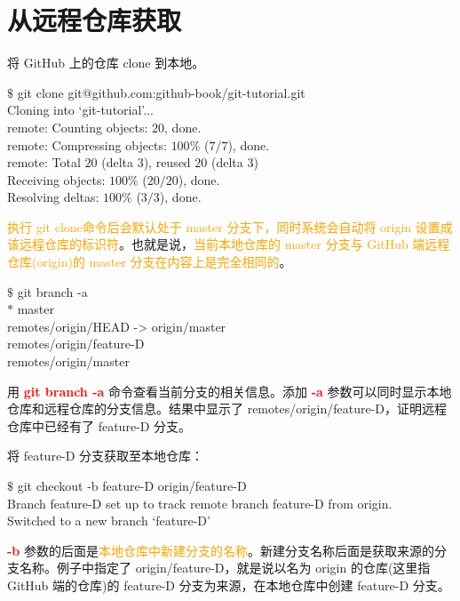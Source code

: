 \documentclass[12pt,a4paper]{article}
\begin{document}
\section{从远程仓库获取}
将 GitHub 上的仓库 clone 到本地。
\begin{tcolorbox}[colback=green!5,colframe=green!40!black,title= ]
$\$$ git clone git@github.com:github-book/git-tutorial.git \\
Cloning into `git-tutorial'... \\
remote: Counting objects: $20$, done. \\
remote: Compressing objects: $100\%$ ($7/7$), done. \\
remote: Total $20$ (delta $3$), reused $20$ (delta $3$) \\
Receiving objects: $100\%$ ($20/20$), done. \\
Resolving deltas: $100\%$ ($3/3$), done. \\
\end{tcolorbox}
\textcolor{orange}{执行 git clone命令后会默认处于 master 分支下，同时系统会自动将 origin 设置成该远程仓库的标识符}。也就是说，\textcolor{orange}{当前本地仓库的 master 分支与 GitHub 端远程仓库(origin)的 master 分支在内容上是完全相同的}。
\begin{tcolorbox}[colback=green!5,colframe=green!40!black,title= ]
$\$$ git branch -a \\
$\ast$ master \\
remotes/origin/HEAD -> origin/master \\
remotes/origin/feature-D \\
remotes/origin/master 
\end{tcolorbox}
用 \textcolor{red}{\bf git branch -a} 命令查看当前分支的相关信息。添加 \textcolor{red}{\bf -a} 参数可以同时显示本地仓库和远程仓库的分支信息。结果中显示了 remotes/origin/feature-D，证明远程仓库中已经有了 feature-D 分支。

将 feature-D 分支获取至本地仓库：
\begin{tcolorbox}[colback=green!5,colframe=green!40!black,title= ]
$\$$ git checkout -b feature-D origin/feature-D \\
Branch feature-D set up to track remote branch feature-D from origin. \\
Switched to a new branch `feature-D'
\end{tcolorbox}
 \textcolor{red}{\bf -b} 参数的后面是\textcolor{orange}{本地仓库中新建分支的名称}。新建分支名称后面是获取来源的分支名称。例子中指定了 origin/feature-D，就是说以名为 origin 的仓库(这里指 GitHub 端的仓库)的 feature-D 分支为来源，在本地仓库中创建 feature-D 分支。
\end{document}
